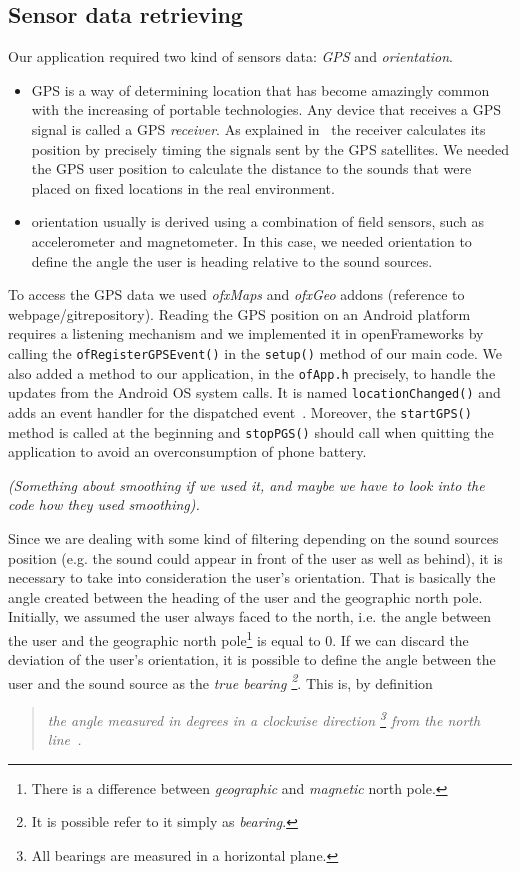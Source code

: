 \documentclass[journal]{IEEEtran}
\begin{document}
\subsection{Sensor data retrieving}
Our application required two kind of sensors data: \emph{GPS} and \emph{orientation}. 
\begin{itemize}  
\item GPS is a way of determining location that has become amazingly common with the increasing of portable technologies. Any device that receives a GPS signal is 	called a GPS \emph{receiver}. As explained in~\cite{} the receiver calculates its position by precisely timing the signals sent by the GPS satellites.
We needed the GPS user position to calculate the distance to the sounds that were placed on fixed locations in the real environment. 
\item orientation usually is derived using a combination of field sensors, such as accelerometer and magnetometer. 
In this case, we needed orientation to define the angle the user is heading relative to the sound sources.
\end{itemize}

To access the GPS data we used \emph{ofxMaps} and \emph{ofxGeo} addons (reference to webpage/gitrepository). Reading the GPS position on an Android platform requires a listening mechanism and we implemented it in openFrameworks by calling the \texttt{ofRegisterGPSEvent()} in the \texttt{setup()} method of our main code. We also added a method to our application, in the \texttt{ofApp.h} precisely, to handle the updates from the Android OS system calls. It is named \texttt{locationChanged()} and adds an event handler for the dispatched event~\cite{}. Moreover, the \texttt{startGPS()} method is called at the beginning and \texttt{stopPGS()} should call when quitting the application to avoid an overconsumption of phone battery.

{\footnotesize \textit{(Something about smoothing if we used it, and maybe we have to look into the code how they used smoothing).}}

Since we are dealing with some kind of filtering depending on the sound sources position (e.g. the sound could appear in front of the user as well as behind), it is necessary to take into consideration the user's orientation. That is basically the angle created between the heading of the user and the geographic north pole. Initially, we assumed the user always faced to the north, i.e. the angle between the user and the geographic north pole\footnote{There is a difference between \emph{geographic} and \emph{magnetic} north pole.} is equal to 0. If we can discard the deviation of the user's orientation, it is possible to define the angle between the user and the sound source as the \emph{true bearing \footnote{It is possible refer to it simply as \emph{bearing}.}}. This is, by definition
\begin{quote}
{\footnotesize{\textit{the angle measured in degrees in a clockwise direction \footnote{All bearings are measured in a horizontal plane.} from the north line~\cite{}.}}}
\end{quote}
\end{document}
